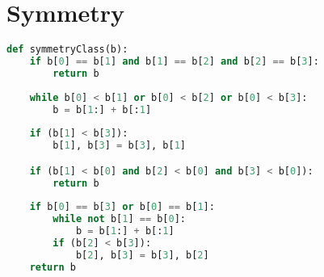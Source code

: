 \section{Symmetry}

\begin{lstlisting}[language = Python,
  basicstyle=\ttfamily\scriptsize,keywordstyle=\color{red},backgroundcolor=\color{white}]
def symmetryClass(b):
    if b[0] == b[1] and b[1] == b[2] and b[2] == b[3]:
        return b
    
    while b[0] < b[1] or b[0] < b[2] or b[0] < b[3]:
        b = b[1:] + b[:1]
    
    if (b[1] < b[3]):
        b[1], b[3] = b[3], b[1]

    if (b[1] < b[0] and b[2] < b[0] and b[3] < b[0]):
        return b
        
    if b[0] == b[3] or b[0] == b[1]:
        while not b[1] == b[0]:
            b = b[1:] + b[:1]
        if (b[2] < b[3]):
            b[2], b[3] = b[3], b[2]
    return b
\end{lstlisting}

